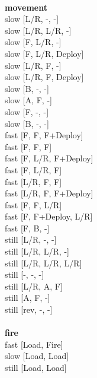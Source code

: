 \ \\ {\bf movement } \\
slow [L/R, -, -] \\
slow [L/R, L/R, -] \\
slow [F, L/R, -] \\
slow [F, L/R, Deploy] \\
slow [L/R, F, -] \\
slow [L/R, F, Deploy] \\
slow [B, -, -] \\
slow [A, F, -] \\
slow [F, -, -] \\
slow [B, -, -] \\
fast [F, F, F+Deploy] \\
fast [F, F, F] \\
fast [F, L/R, F+Deploy] \\
fast [F, L/R, F] \\
fast [L/R, F, F] \\
fast [L/R, F, F+Deploy] \\
fast [F, F, L/R] \\
fast [F, F+Deploy, L/R] \\
fast [F, B, -] \\
still [L/R, -, -] \\
still [L/R, L/R, -] \\
still [L/R, L/R, L/R] \\
still [-, -, -] \\
still [L/R, A, F] \\
still [A, F, -] \\
still [rev, -, -] \\
\ \\ {\bf fire } \\
fast [Load, Fire] \\
slow [Load, Load] \\
still [Load, Load] \\


